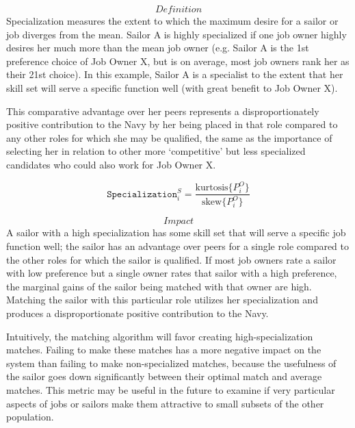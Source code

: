 \[\textit{Definition}\] 
Specialization measures the extent to which the maximum desire for a sailor or job diverges from the mean. Sailor A is highly specialized if one job owner highly desires her much more than the mean job owner (e.g. Sailor A is the 1st preference choice of Job Owner X, but is on average, most job owners rank her as their 21st choice). In this example, Sailor A is a specialist to the extent that her skill set will serve a specific function well (with great benefit to Job Owner X). 

This comparative advantage over her peers represents a disproportionately positive contribution to the Navy by her being placed in that role compared to any other roles for which she may be qualified, the same as the importance of selecting her in relation to other more ‘competitive’ but less specialized candidates who could also work for Job Owner X. 

\[\texttt{Specialization}^S_i = \frac{\text{kurtosis}\{P^O_i\}}{\text{skew}\{P^O_i\}}\]

\[\textit{Impact}\] 
A sailor with a high specialization has some skill set that will serve a specific job function well; the sailor has an advantage over peers for a single role compared to the other roles for which the sailor is qualified. If most job owners rate a sailor with low preference but a single owner rates that sailor with a high preference, the marginal gains of the sailor being matched with that owner are high. Matching the sailor with this particular role utilizes her specialization and produces a disproportionate positive contribution to the Navy. 

Intuitively, the matching algorithm will favor creating high-specialization matches. Failing to make these matches has a more negative impact on the system than failing to make non-specialized matches, because the usefulness of the sailor goes down significantly between their optimal match and average matches. This metric may be useful in the future to examine if very particular aspects of jobs or sailors make them attractive to small subsets of the other population.
